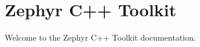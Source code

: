 \chapter{Zephyr C++ Toolkit}
\hypertarget{index}{}\label{index}
\label{index_md_doxygen__mainpage}%
%
 Welcome to the Zephyr C++ Toolkit documentation. 